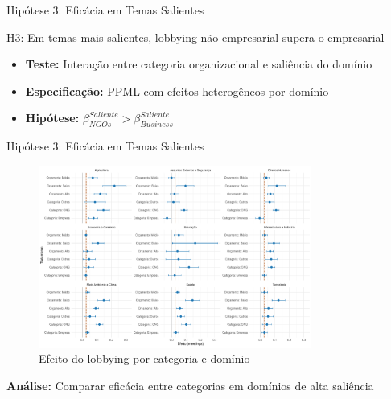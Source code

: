\documentclass[aspectratio=169]{beamer}
\begin{document}
\begin{frame}{Hipótese 3: Eficácia em Temas Salientes}
\begin{block}{H3: Em temas mais salientes, lobbying não-empresarial supera o empresarial}
\begin{itemize}
\item \textbf{Teste:} Interação entre categoria organizacional e saliência do domínio
\item \textbf{Especificação:} PPML com efeitos heterogêneos por domínio
\item \textbf{Hipótese:} $\beta_{NGOs}^{Saliente} > \beta_{Business}^{Saliente}$
\end{itemize}
\end{block}
\end{frame}

\begin{frame}{Hipótese 3: Eficácia em Temas Salientes}
\begin{figure}
\centering
\includegraphics[width=0.8\textwidth]{figures/fig_coeff_treatments_by_domain.pdf}
\caption{Efeito do lobbying por categoria e domínio}
\end{figure}

\textbf{Análise:} Comparar eficácia entre categorias em domínios de alta saliência
\end{frame}
\end{document}
